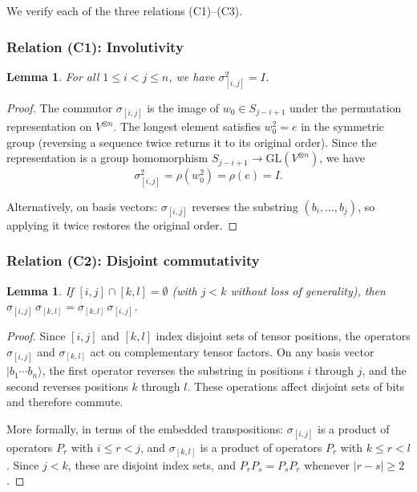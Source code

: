\documentclass[11pt]{article}
\newtheorem{lemma}[theorem]{Lemma}
\theoremstyle{remark}
\newcommand{\ket}[1]{|#1\rangle}
\begin{document}
We verify each of the three relations (C1)--(C3).

\subsubsection*{Relation (C1): Involutivity}

\begin{lemma}\label{lem:involution}
For all $1 \leq i < j \leq n$, we have $\sigma_{[i,j]}^2 = I$.
\end{lemma}

\begin{proof}
The commutor $\sigma_{[i,j]}$ is the image of $w_0 \in S_{j-i+1}$ under
the permutation representation on $V^{\otimes n}$. The longest element
satisfies $w_0^2 = e$ in the symmetric group (reversing a sequence twice
returns it to its original order). Since the representation is a group
homomorphism $S_{j-i+1} \to \mathrm{GL}(V^{\otimes n})$, we have
\[
  \sigma_{[i,j]}^2 = \rho(w_0^2) = \rho(e) = I.
\]

Alternatively, on basis vectors: $\sigma_{[i,j]}$ reverses the substring
$(b_i, \ldots, b_j)$, so applying it twice restores the original order.
\end{proof}

\subsubsection*{Relation (C2): Disjoint commutativity}

\begin{lemma}\label{lem:disjoint}
If $[i,j] \cap [k,l] = \emptyset$ (with $j < k$ without loss of generality),
then $\sigma_{[i,j]}\, \sigma_{[k,l]} = \sigma_{[k,l]}\, \sigma_{[i,j]}$.
\end{lemma}

\begin{proof}
Since $[i,j]$ and $[k,l]$ index disjoint sets of tensor positions, the
operators $\sigma_{[i,j]}$ and $\sigma_{[k,l]}$ act on complementary tensor
factors. On any basis vector $\ket{b_1 \cdots b_n}$, the first operator
reverses the substring in positions $i$ through $j$, and the second reverses
positions $k$ through $l$. These operations affect disjoint sets of bits and
therefore commute.

More formally, in terms of the embedded transpositions: $\sigma_{[i,j]}$ is
a product of operators $P_r$ with $i \leq r < j$, and $\sigma_{[k,l]}$ is
a product of operators $P_r$ with $k \leq r < l$. Since $j < k$, these are
disjoint index sets, and $P_r P_s = P_s P_r$ whenever $|r - s| \geq 2$.
\end{proof}
\end{document}
